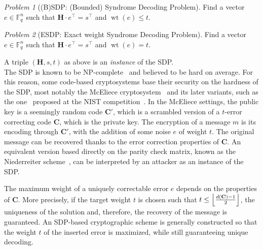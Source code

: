 \documentclass[11pt]{article}
\newcommand{\F}[0]{\mathbb{F}}
\DeclarePairedDelimiter{\fl}{\lfloor}{\rfloor}
\theoremstyle{plain}
\theoremstyle{definition}
\theoremstyle{remark}
\newtheorem{prob}{Problem}
\begin{document}
\begin{prob}[(B)SDP: (Bounded) Syndrome Decoding Problem]
    Find a vector $e\in\F_q^n$ such that $\mathbf{H}\cdot e^\top=s^\top$ and $\operatorname{wt}(e)\leq t$.
\end{prob}

\begin{prob}[ESDP: Exact weight Syndrome Decoding Problem]
    Find a vector $e\in\F_q^n$ such that $\mathbf{H}\cdot e^\top=s^\top$ and $\operatorname{wt}(e)=t$.
\end{prob}

A triple $(\mathbf{H},s,t)$ as above is an \textit{instance} of the SDP.\\

The SDP is known to be NP-complete~\cite{1055873} and believed to be hard on average. For this reason, some code-based cryptosystems base their security on the hardness of the SDP, most notably the McEliece cryptosystem~\cite{mceliece1978public} and its later variants, such as the one~\cite{ClassicMcEliece2022} proposed at the NIST competition~\cite{Alagic2025NISTIR8545}. In the McEliece settings, the public key is a seemingly random code $\mathbf{C'}$, which is a scrambled version of a $t$-error correcting code $\mathbf{C}$, which is the private key. The encryption of a message $m$ is its encoding through $\mathbf{C'}$, with the addition of some noise $e$ of weight $t$. The original message can be recovered thanks to the error correction properties of $\mathbf{C}$. An equivalent version based directly on the parity check matrix, known as the Niederreiter scheme~\cite{1571980076566605568}, can be interpreted by an attacker as an instance of the SDP.

The maximum weight of a uniquely correctable error $e$ depends on the properties of $\mathbf{C}$. More precisely, if the target weight $t$ is chosen such that $t\leq\fl*{\frac{d(\mathbf{C})-1}{2}}$, the uniqueness of the solution and, therefore, the recovery of the message is guaranteed. An SDP-based cryptographic scheme is generally constructed so that the weight $t$ of the inserted error is maximized, while still guaranteeing unique decoding.
\end{document}
